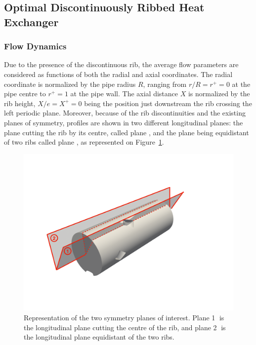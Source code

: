 \subsection{Optimal Discontinuously Ribbed Heat Exchanger}
\label{sec:optimal}
\subsubsection{Flow Dynamics}

Due to the presence of the discontinuous rib, the average flow parameters are considered as functions of both the radial and axial coordinates. The radial coordinate is normalized by the pipe radius $R$, ranging from $r/R=r^+=0$ at the pipe centre to $r^+=1$ at the pipe wall. The axial distance $X$ is normalized by the rib height, $X/e=X^+=0$ being the position just downstream the rib crossing the left periodic plane. Moreover, because of the rib discontinuities and the existing planes of symmetry, profiles are shown in two different longitudinal planes: the plane cutting the rib by its centre, called plane , and the plane being equidistant of two ribs called plane , as represented on Figure~\ref{planes}.

\begin{figure}[!ht]
\centering
\includegraphics[width=0.6\linewidth,keepaspectratio]{fig/applications/optim/PlaneS.pdf}
\caption{Representation of the two symmetry planes of interest. Plane \textcircled{1} is the longitudinal plane cutting the centre of the rib, and plane \textcircled{2} is the longitudinal plane equidistant of the two ribs.}
\label{planes}
\end{figure}

